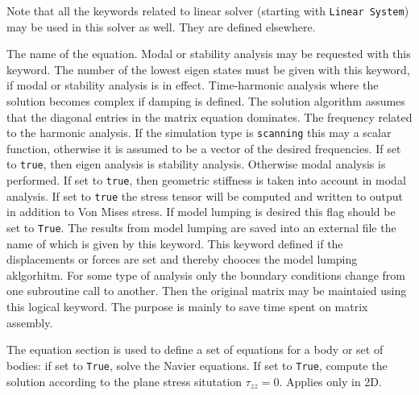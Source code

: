 \sifbegin

Note that all the keywords related to linear solver (starting
with {\tt Linear System})
may be used in this solver as well.  They are defined elsewhere. 

\sifbegin
{} 
The name of the equation.
Modal or stability analysis may be requested with this keyword.
The number of the lowest eigen states must be given with this keyword,
if modal or stability analysis is in effect.
Time-harmonic analysis where the solution becomes complex if damping is defined. 
The solution algorithm assumes that the diagonal entries in the matrix equation dominates.
The frequency related to the harmonic analysis. If the simulation type is \texttt{scanning} 
this may a scalar function, otherwise it is assumed to be a vector of the desired frequencies.
If set to {\tt{true}}, then eigen analysis is stability analysis.
Otherwise modal analysis is performed.
If set to {\tt{true}}, then geometric stiffness is taken into account in modal analysis.
If set to {\tt{true}} the stress tensor will be computed and written to
output in addition to Von Mises stress.
If model lumping is desired this flag should be set to \texttt{True}.
The results from model lumping are saved into an external file the 
name of which is given by this keyword.
This keyword defined if the displacements or forces are set and thereby chooces the 
model lumping aklgorhitm. 
For some type of analysis only the boundary conditions change from one subroutine call to another.
Then the original matrix may be maintaied using this logical keyword. The purpose is mainly to save 
time spent on matrix assembly.
\sifend

The equation section is used to define a set of equations for a body or set of bodies:
\sifbegin
{} if set to {\tt True}, solve the Navier equations.
 If set to {\tt True}, compute the solution
according to the plane stress situtation $\tau_{zz}=0$. Applies only in 2D.
\sifend

